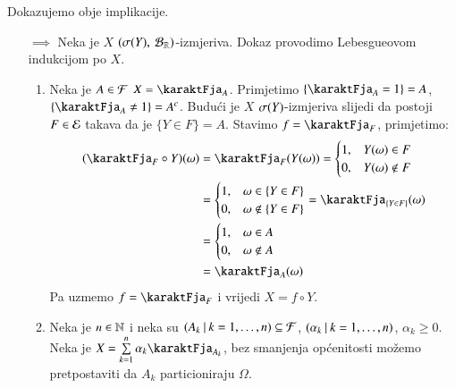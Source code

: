 \begin{rj}[\ref{zad:3.20}]
    Dokazujemo obje implikacije.
    \begin{itemize}
        \item[$\implies$]
        Neka je $X$ $({\sigma({Y})}, \: {\mathcal{B}_{\mathbb{R}}})$-izmjeriva.
        Dokaz provodimo Lebesgueovom indukcijom po $X$.
        \begin{enumerate}[label=(\arabic*. korak)]
            \item Neka je $A \in \mathcal{F}$ $X = \karaktFja_A$.
            Primjetimo $\{ \karaktFja_A = 1 \} = A$, $\{ \karaktFja_A \neq 1 \} = A^c$.
            Budu\' ci je $X$ $\sigma({Y})$-izmjeriva slijedi da postoji $F \in \mathcal{E}$ takava da je $\{Y \in F\} = A$.
            Stavimo $f = \karaktFja_F$, primjetimo:
            \begin{equation*}
                \begin{aligned}
                    (\karaktFja_F \circ Y)(\omega)
                    &= \karaktFja_F (Y(\omega))
                    =
                    \begin{cases}
                        1, &Y(\omega) \in F\\
                        0, &Y(\omega) \notin F 
                    \end{cases}\\
                    &=
                    \begin{cases}
                        1, &\omega \in \{Y \in F\}\\
                        0, &\omega \notin \{Y \in F\}
                    \end{cases}
                    = \karaktFja_{\{Y \in F\}} (\omega)\\
                    &=
                    \begin{cases}
                        1, &\omega \in A\\
                        0, &\omega \notin A
                    \end{cases}\\
                    &= \karaktFja_A (\omega)
                \end{aligned}
            \end{equation*}
            Pa uzmemo $f = \karaktFja_F$ i vrijedi $X = f \circ Y$.
            \item Neka je $n \in \mathbb{N}$ i neka su $({A_k} \: | \: {k = 1, \ldots, n}) \subseteq \mathcal{F}$, $({\alpha_k} \: | \: {k = 1, \ldots, n})$, $\alpha_k \geq 0$.
            Neka je $X = \suma{k = 1}{n} \alpha_k \karaktFja_{A_k}$, bez smanjenja op\' cenitosti mo\v zemo pretpostaviti da $A_k$ particioniraju $\Omega$.

\end{enumerate}
\end{itemize}
\end{rj}

